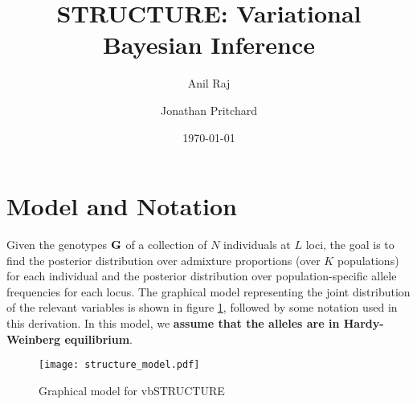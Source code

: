 \documentclass[reqno]{amsart}
\numberwithin{equation}{section}
\begin{document}
\title{STRUCTURE: Variational Bayesian Inference}

\author{Anil Raj}
\author{Jonathan Pritchard}

\date{\today}

\maketitle

\section{Model and Notation}
Given the genotypes $\mathbf{G}$ of a collection of $N$ individuals at $L$ loci, the goal is to find the posterior distribution over admixture proportions (over $K$ populations) for each individual and the posterior distribution over population-specific allele frequencies for each locus. The graphical model representing the joint distribution of the relevant variables is shown in figure \ref{fig:model}, followed by some notation used in this derivation. In this model, we \textbf{assume that the alleles are in Hardy-Weinberg equilibrium}.

\begin{figure}[!h]
    \begin{center}
        \texttt{[image: structure\_model.pdf]}
    \end{center}
    \caption{Graphical model for vbSTRUCTURE}
    \label{fig:model}
\end{figure}
\end{document}
